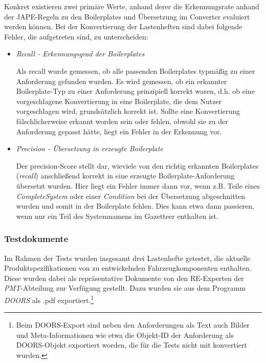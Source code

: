 \documentclass[12pt]{report}
\begin{document}
Konkret existieren zwei primäre Werte, anhand derer die Erkennungsrate anhand der JAPE-Regeln zu den Boilerplates und Übersetzung im Converter evaluiert werden können. Bei der Konvertierung der Lastenheften sind dabei folgende Fehler, die aufgetreten sind, zu unterscheiden:
\begin{itemize}
\item \textit{Recall - Erkennungsgrad der Boilerplates} 

Als recall wurde gemessen, ob alle passenden Boilerplates typmäßig zu einer Anforderung gefunden wurden. Es wird gemessen, ob ein erkannter Boilerplate-Typ zu einer Anforderung prinzipiell korrekt waren, d.h. ob eine vorgeschlagene Konvertierung in eine Boilerplate, die dem Nutzer vorgeschlagen wird, grundsätzlich korrekt ist. Sollte eine Konvertierung fälschlicherweise erkannt worden sein oder fehlen, obwohl sie zu der Anforderung gepasst hätte, liegt ein Fehler in der Erkennung vor.

\item \textit{Precision - Übersetzung in erzeugte Boilerplate} 

Der precision-Score stellt dar, wieviele von den richtig erkannten Boilerplates (\textit{recall}) anschließend korrekt in eine erzeugte Boilerplate-Anforderung übersetzt wurden. Hier liegt ein Fehler immer dann vor, wenn z.B. Teile eines \textit{CompleteSystem} oder einer \textit{Condition} bei der Übersetzung abgeschnitten wurden und somit in der Boilerplate fehlen. Dies kann etwa dann passieren, wenn nur ein Teil des Systemnamens im Gazetteer enthalten ist. 
\end{itemize}

\subsubsection{Testdokumente}
Im Rahmen der Tests wurden insgesamt drei Lastenhefte getestet, die aktuelle Produktspezifikationen von zu entwickelnden Fahrzeugkomponenten enthalten. Diese wurden dabei als repräsentative Dokumente von den RE-Experten der \textit{PMT}-Abteilung zur Verfügung gestellt. Dazu wurden sie aus dem Programm \textit{DOORS} als .pdf exportiert.\footnote{Beim DOORS-Export sind neben den Anforderungen als Text auch Bilder und Meta-Informationen wie etwa die Objekt-ID der Anforderung als DOORS-Objekt exportiert worden, die für die Tests nicht mit konvertiert wurden.} 
\end{document}
